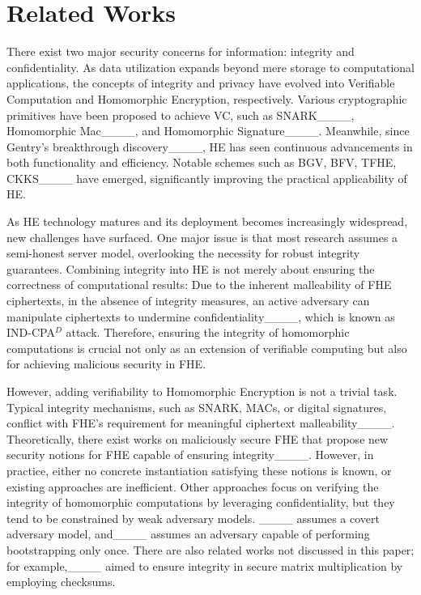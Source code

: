 \section{Related Works}
There exist two major security concerns for information: integrity and confidentiality. As data utilization expands beyond mere storage to computational applications, the concepts of integrity and privacy have evolved into Verifiable Computation and Homomorphic Encryption, respectively.
    Various cryptographic primitives have been proposed to achieve VC, such as SNARK____, Homomorphic Mac____, and Homomorphic Signature____. Meanwhile, since Gentry's breakthrough discovery____, HE has seen continuous advancements in both functionality and efficiency. Notable schemes such as BGV, BFV, TFHE, CKKS____ have emerged, significantly improving the practical applicability of HE. 
    
    As HE technology matures and its deployment becomes increasingly widespread, new challenges have surfaced. One major issue is that most research assumes a semi-honest server model, overlooking the necessity for robust integrity guarantees.
    Combining integrity into HE is not merely about ensuring the correctness of computational results: Due to the inherent malleability of FHE ciphertexts, in the absence of integrity measures, an active adversary can manipulate ciphertexts to undermine confidentiality____, which is known as IND-CPA$^D$ attack. Therefore, ensuring the integrity of homomorphic computations is crucial not only as an extension of verifiable computing but also for achieving malicious security in FHE.

    However, adding verifiability to Homomorphic Encryption is not a trivial task.  
    Typical integrity mechanisms, such as SNARK, MACs, or digital signatures, conflict with FHE’s requirement for meaningful ciphertext malleability____. Theoretically, there exist works on maliciously secure FHE that propose new security notions for FHE capable of ensuring integrity____.  
    However, in practice, either no concrete instantiation satisfying these notions is known, or existing approaches are inefficient.
    Other approaches focus on verifying the integrity of homomorphic computations by leveraging confidentiality, but they tend to be constrained by weak adversary models. ____ assumes a covert adversary model, and____ assumes an adversary capable of performing bootstrapping only once. There are also related works not discussed in this paper; for example,____ aimed to ensure integrity in secure matrix multiplication by employing checksums.
    
